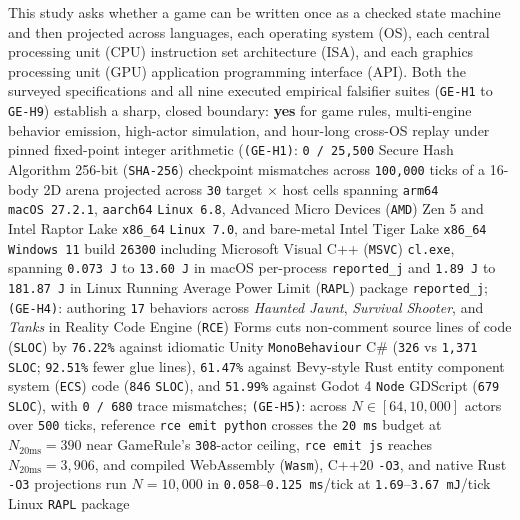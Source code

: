 \documentclass[10pt,letterpaper]{article}
\begin{document}
This study asks whether a game can be written once as a checked state
machine and then projected across languages, each operating system (OS),
each central processing unit (CPU) instruction set architecture (ISA),
and each graphics processing unit (GPU) application programming
interface (API). Both the surveyed specifications and all nine executed
empirical falsifier suites (\texttt{GE-H1} to \texttt{GE-H9}) establish
a sharp, closed boundary: \textbf{yes} for game rules, multi-engine
behavior emission, high-actor simulation, and hour-long cross-OS replay
under pinned fixed-point integer arithmetic (\texttt{(GE-H1)}:
\texttt{0\ /\allowbreak{}\ 25,\allowbreak{}500} Secure Hash Algorithm 256-bit (\texttt{SHA-256})
checkpoint mismatches across \texttt{100,000} ticks of a 16-body 2D
arena projected across \texttt{30} target × host cells spanning
\texttt{arm64} \texttt{macOS\ 27.\allowbreak{}2.\allowbreak{}1}, \texttt{aarch64}
\texttt{Linux\ 6.\allowbreak{}8}, Advanced Micro Devices (\texttt{AMD}) Zen 5 and
Intel Raptor Lake \texttt{x86\_64} \texttt{Linux\ 7.\allowbreak{}0}, and bare-metal
Intel Tiger Lake \texttt{x86\_64} \texttt{Windows\ 11} build
\texttt{26300} including Microsoft Visual C++ (\texttt{MSVC})
\texttt{cl.exe}, spanning \texttt{0.073\ J} to \texttt{13.60\ J} in
macOS per-process \texttt{reported\_\allowbreak{}j} and \texttt{1.89\ J} to
\texttt{181.87\ J} in Linux Running Average Power Limit (\texttt{RAPL})
package \texttt{reported\_\allowbreak{}j}; \texttt{(GE-H4)}: authoring \texttt{17}
behaviors across \emph{Haunted Jaunt}, \emph{Survival Shooter}, and
\emph{Tanks} in Reality Code Engine (\texttt{RCE}) Forms cuts
non-comment source lines of code (\texttt{SLOC}) by \texttt{76.22\%}
against idiomatic Unity \texttt{MonoBehaviour} C\# (\texttt{326} vs
\texttt{1,371} \texttt{SLOC}; \texttt{92.51\%} fewer glue lines),
\texttt{61.47\%} against Bevy-style Rust entity component system
(\texttt{ECS}) code (\texttt{846} \texttt{SLOC}), and \texttt{51.99\%}
against Godot 4 \texttt{Node} GDScript (\texttt{679} \texttt{SLOC}),
with \texttt{0\ /\ 680} trace mismatches; \texttt{(GE-H5)}: across
\(N \in [64, 10{,}000]\) actors over \texttt{500} ticks, reference
\texttt{rce\ emit\ python} crosses the \texttt{20\ ms} budget at
\(N_{20\text{ms}} = 390\) near GameRule's \texttt{308}-actor ceiling,
\texttt{rce\ emit\ js} reaches \(N_{20\text{ms}} = 3{,}906\), and
compiled WebAssembly (\texttt{Wasm}), C++20 \texttt{-O3}, and native
Rust \texttt{-O3} projections run \(N = 10{,}000\) in
\texttt{0.058}--\texttt{0.125\ ms}/\allowbreak{}tick at
\texttt{1.69}--\texttt{3.67\ mJ}/\allowbreak{}tick Linux \texttt{RAPL} package
\end{document}
